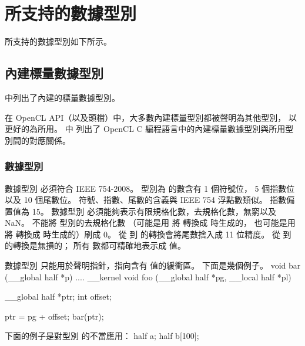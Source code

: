 \section{所支持的數據型別}

所支持的數據型別如下所示。

\subsection[sec:bisdt]{內建標量數據型別}

中列出了內建的標量數據型別。

{}

在 OpenCL API（以及頭檔）中，大多數內建標量型別都被聲明為其他型別，
以更好的為所用。
中
列出了 OpenCL C 編程語言中的內建標量數據型別與所用型別間的對應關係。

{}

\subsubsection[sec:dataTypeHalf]{數據型別 }

數據型別  必須符合 IEEE 754-2008。
型別為  的數含有 1 個符號位， 5 個指數位以及 10 個尾數位。
符號、指數、尾數的含義與 IEEE 754 浮點數類似。
指數偏置值為 15。
數據型別  必須能夠表示有限規格化數，去規格化數，無窮以及 NaN。
不能將  型別的去規格化數
（可能是用  將  轉換成  時生成的，
也可能是用  將  轉換成  時生成的）刷成 0。
從  到  的轉換會將尾數捨入成 11 位精度。
從   到  的轉換是無損的；
所有  數都可精確地表示成  值。

數據型別  只能用於聲明指針，指向含有  值的緩衝區。
下面是幾個例子。
\startclc
void bar (__global half *p)
{
	....
}
__kernel void foo (__global half *pg, __local half *pl)
{
	__global half *ptr;
	int offset;

	ptr = pg + offset;
	bar(ptr);
}
\stopclc

下面的例子是對型別  的不當應用：
\startclc
half a;
half b[100];

